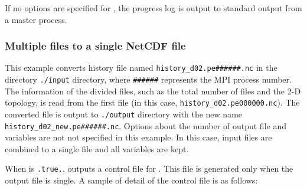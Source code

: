 If no options are specified for , the progress log is output to standard output from a master process.

\subsubsection{Multiple \scalenetcdf files to a single NetCDF file}


This example converts history file named \verb|history_d02.pe######.nc| in the directory \verb|./input| directory, where \verb|######| represents the MPI process number.
The information of the divided files, such as the total number of files and the 2-D topology, is read from the first file (in this case, \verb|history_d02.pe000000.nc|). The converted file is output to \verb|./output| directory with the new name \verb|history_d02_new.pe######.nc|.
Options about the number of output file and variables are not not specified in this example. In this case, input files are combined to a single file and all variables are kept.

When  is \verb|.true.|, \sno outputs a control file for \grads. This file is generated only when the output file is single. A sample of detail of the control file is as follows:

